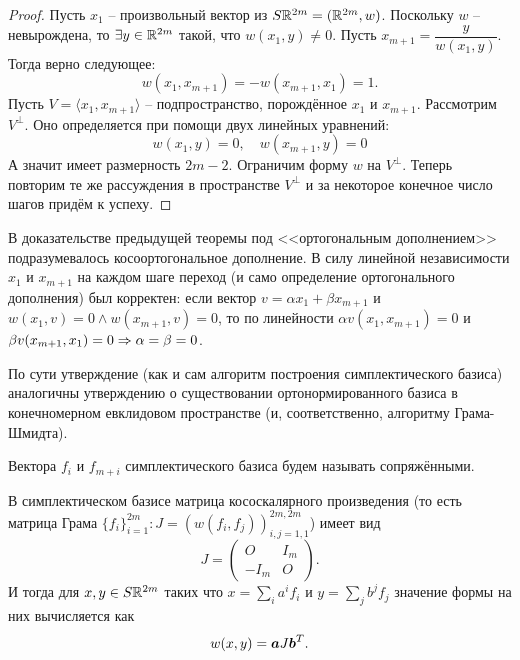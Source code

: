 \begin{proof}
    Пусть $x_1$ -- произвольный вектор из $S\mathbb{R}^{2m} = (\mathbb{R}^{2m}, w)$.
    Поскольку $w$ -- невырождена, то $\exists y \in \mathbb{R}^{2m}$ такой, что $w(x_1, y) \neq 0$.
    Пусть $x_{m + 1} = \dfrac{y}{w(x_1, y)}$.
    Тогда верно следующее:
    \[
        w(x_1, x_{m + 1}) = -w(x_{m + 1}, x_1) = 1.
    \]
    Пусть $V = \langle x_1, x_{m + 1} \rangle$ -- подпространство, порождённое $x_1$ и $x_{m + 1}$.
    Рассмотрим $V^\perp$.
    Оно определяется при помощи двух линейных уравнений:
    \[
        w(x_1, y) = 0, \quad w(x_{m + 1}, y) = 0
    \]
    А значит имеет размерность $2m - 2$.
    Ограничим форму $w$ на $V^\perp$.
    Теперь повторим те же рассуждения в пространстве $V^\perp$ и за некоторое конечное число шагов придём к успеху.
\end{proof}
\begin{note}
    В доказательстве предыдущей теоремы под <<ортогональным дополнением>> подразумевалось косоортогональное дополнение.
    В силу линейной независимости $x_1$ и $x_{m + 1}$ на каждом шаге переход (и само определение ортогонального дополнения) был корректен: если вектор $v = \alpha x_1 + \beta x_{m + 1}$ и $w(x_1, v) = 0 \wedge w(x_{m + 1}, v) = 0$, то по линейности $\alpha v(x_1, x_{m + 1}) = 0$ и $\beta v(x_{m + 1}, x_1) = 0 \Rightarrow \alpha = \beta = 0$.
\end{note}
\begin{note}
    По сути утверждение (как и сам алгоритм построения симплектического базиса) аналогичны утверждению о существовании ортонормированного базиса в конечномерном евклидовом пространстве (и, соответственно, алгоритму Грама-Шмидта).
\end{note}
\begin{definition}
    Вектора $f_i$ и $f_{m + i}$ симплектического базиса будем называть сопряжёнными.
\end{definition}
\begin{note}
    В симплектическом базисе матрица кососкалярного произведения (то есть матрица Грама $\{f_i\}_{i = 1}^{2m}: J = (w(f_i, f_j))_{i, j = 1, 1}^{2m, 2m}$) имеет вид
    \[
        J = \begin{pmatrix*}
                O & I_m \\ -I_m & O
        \end{pmatrix*}.
    \]
    И тогда для $x, y \in S\mathbb{R}^{2m}$ таких что $x = \sum\limits_{i} a^i f_i$ и $y = \sum\limits_{j} b^{j} f_j$ значение формы на них вычисляется как
    \[
        w(x, y) = \boldsymbol{a} J \boldsymbol{b}^T.
    \]
\end{note}
